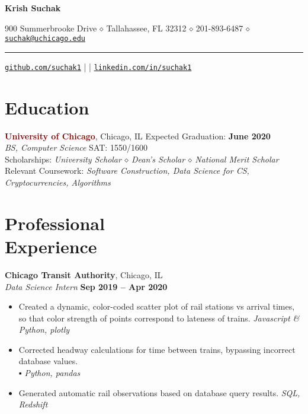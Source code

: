 \documentclass[margin]{resume}
\begin{document}
\centerline{\textbf {\Large Krish Suchak}}
\centerline{900 Summerbrooke Drive $\smwhtdiamond$ Tallahassee, FL 32312 $\smwhtdiamond$ 201-893-6487 $\smwhtdiamond$ \texttt{\href{mailto:suchak@uchicago.edu}{suchak@uchicago.edu}}}
\vspace{3mm}
\hrule
\vspace{1mm}
\centerline{\texttt{\href{https://github.com/suchak1}{github.com/suchak1}} \hspace{10mm} | | \hspace{10mm} \texttt{\href{https://linkedin.com/in/suchak1}{linkedin.com/in/suchak1}}}

    \section{\mysidestyle Education}

    \textcolor{maroon}{\textbf{University of Chicago}}, Chicago, IL \hfill Expected Graduation: \textbf{June 2020} \vspace{2mm}\\\vspace{1mm}%
    \textsl{BS, Computer Science} \hfill SAT: 1550/1600\\
Scholarships: \textit{University Scholar $\smwhtdiamond$ Dean’s Scholar $\smwhtdiamond$ National Merit Scholar}\\
Relevant Coursework: \textit{Software Construction, Data Science for CS, Cryptocurrencies, Algorithms}

    \section{\mysidestyle Professional\\Experience}

    \textcolor{blu}{\textbf{Chicago Transit Authority}}, Chicago, IL \vspace{2mm}\\\vspace{1mm}%
    \textsl{Data Science Intern} \hfill \textbf{Sep 2019 -- Apr 2020}

    \begin{itemize}
\item Created a dynamic, color-coded scatter plot  of rail stations vs arrival times, so that color strength of points correspond to lateness of trains. \hfill \textit{Javascript \& Python, plotly}

\item Corrected headway calculations for time between trains, bypassing incorrect database values. \\ ▪ \hfill \textit{Python, pandas}

\item Generated automatic rail observations based on database query results. \hfill \textit{SQL, Redshift}

    \end{itemize}
    
\end{document}
